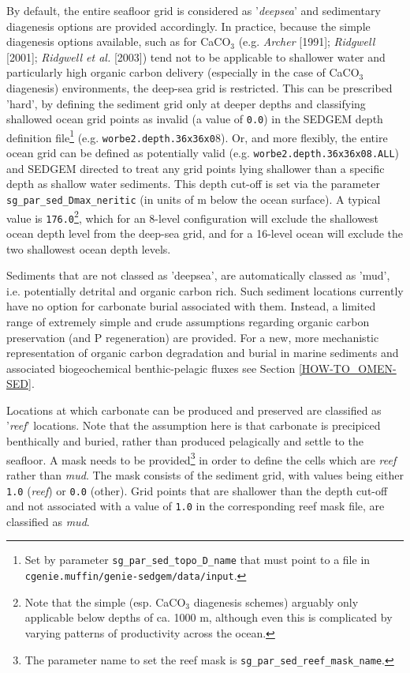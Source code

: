 \documentclass[11pt,fleqn]{book} %
\begin{document}
By default, the entire seafloor grid is considered as '\textit{deepsea}' and sedimentary diagenesis options are provided accordingly. In practice, because the simple diagenesis options available, such as for CaCO\(_{3}\) (e.g. \textit{Archer} [1991]; \textit{Ridgwell} [2001]; \textit{Ridgwell et al.} [2003]) tend not to be applicable to shallower water and particularly high organic carbon delivery (especially in the case of CaCO\(_{3}\) diagenesis) environments, the deep-sea grid is restricted. This can be prescribed 'hard', by defining the sediment grid only at deeper depths and classifying shallowed ocean grid points as invalid (a value of \texttt{0.0}) in the SEDGEM depth definition file\footnote{Set by parameter \texttt{sg\_par\_sed\_topo\_D\_name} that must point to a file in \texttt{cgenie.muffin/genie-sedgem/data/input}.} (e.g. \texttt{worbe2.depth.36x36x0}8).
 Or, and more flexibly, the entire ocean grid can be defined as potentially valid (e.g. \texttt{worbe2.depth.36x36x08.ALL}) and SEDGEM directed to treat any grid points lying shallower than a specific depth as shallow water sediments. This depth cut-off is set via the parameter \texttt{sg\_par\_sed\_Dmax\_neritic} (in units of m below the ocean surface). A typical value is \texttt{176.0}\footnote{Note that the simple (esp. CaCO\(_{3}\) diagenesis schemes) arguably only applicable below depths of ca. 1000 m, although even this is complicated by varying patterns of productivity across the ocean.}, which for an 8-level configuration will exclude the shallowest ocean depth level from the deep-sea grid, and for a 16-level ocean will exclude the two shallowest ocean depth levels.

Sediments that are not classed as 'deepsea', are automatically classed as 'mud', i.e. potentially detrital and organic carbon rich. Such sediment locations  currently have no option for carbonate burial associated with them. Instead, a limited range of extremely simple and crude assumptions regarding organic carbon preservation (and P regeneration) are provided.
For a new, more mechanistic representation of organic carbon degradation and burial in marine sediments and associated biogeochemical benthic-pelagic fluxes see Section \ref{HOW-TO_OMEN-SED}.

Locations at which  carbonate can be produced and preserved
are classified
as '\textit{reef}' locations. Note that the assumption here is that carbonate is precipiced benthically and buried, rather than produced pelagically and  settle to the seafloor.
A mask needs to be provided\footnote{The parameter name to set the reef mask is \texttt{sg\_par\_sed\_reef\_mask\_name}.} in order to define the cells which are \textit{reef} rather than \textit{mud}. The mask consists of the sediment grid, with values being either \texttt{1.0} (\textit{reef}) or \texttt{0.0} (other).  Grid points that are shallower than the depth cut-off and not associated with a value of \texttt{1.0} in the corresponding reef mask file, are classified as \textit{mud}.
\end{document}
